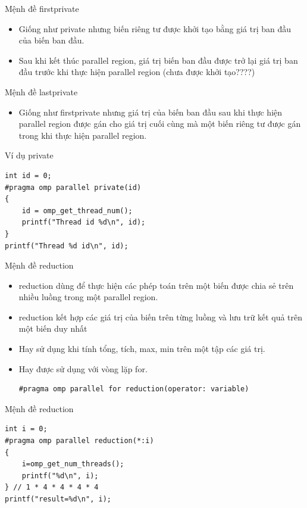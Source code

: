 \documentclass[10pt]{beamer}
\theoremstyle{remark}
\numberwithin{algocf}{section}
\numberwithin{equation}{section}
\numberwithin{dl}{section}
\numberwithin{figure}{section}
\begin{document}
\begin{frame}{Mệnh đề firstprivate}
    \begin{itemize}
        \item Giống như private nhưng biến riêng tư được khởi tạo bằng giá trị ban đầu của biến ban đầu.
        \item Sau khi kết thúc parallel region, giá trị biến ban đầu được trở lại giá trị ban đầu trước khi thực hiện parallel region (chưa được khởi tạo????)
    \end{itemize}
\end{frame}

\begin{frame}{Mệnh đề lastprivate}
    \begin{itemize}
        \item Giống như firstprivate nhưng giá trị của biến ban đầu sau khi thực hiện parallel region được gán cho giá trị cuối cùng mà một biến riêng tư được gán trong khi thực hiện parallel region.
    \end{itemize}
\end{frame}

\begin{frame}[fragile]{Ví dụ private}
    \begin{verbatim}
int id = 0;
#pragma omp parallel private(id)
{
    id = omp_get_thread_num();
    printf("Thread id %d\n", id);
}
printf("Thread %d id\n", id);
    \end{verbatim}
\end{frame}

\begin{frame}[fragile]{Mệnh đề reduction}
    \begin{itemize}
        \item reduction dùng để thực hiện các phép toán trên một biến được chia sẻ trên nhiều luồng trong một parallel region.
        \item reduction kết hợp các giá trị của biến trên từng luồng và lưu trữ kết quả trên một biến duy nhất
        \item Hay sử dụng khi tính tổng, tích, max, min trên một tập các giá trị.
        \item Hay được sử dụng với vòng lặp for.
        \begin{verbatim}
#pragma omp parallel for reduction(operator: variable)
        \end{verbatim}
    \end{itemize}
\end{frame}

\begin{frame}[fragile]{Mệnh đề reduction}
    \begin{verbatim}
int i = 0;
#pragma omp parallel reduction(*:i)
{
    i=omp_get_num_threads();
    printf("%d\n", i);
} // 1 * 4 * 4 * 4 * 4
printf("result=%d\n", i); 
    \end{verbatim}
\end{frame}
\end{document}
